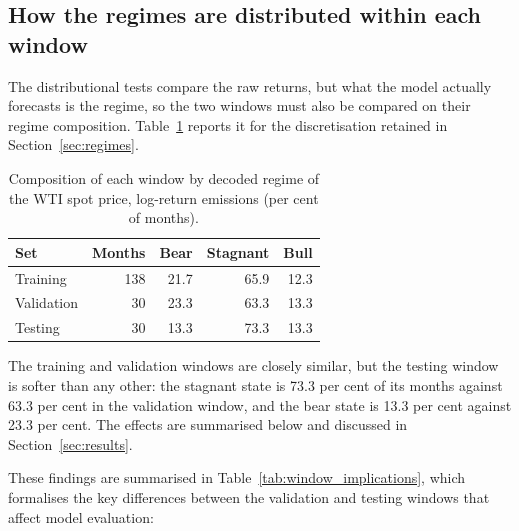 \documentclass[11pt,a4paper]{article}
\begin{document}
\subsection{How the regimes are distributed within each window}

The distributional tests compare the raw returns, but what the model actually 
forecasts is the regime, so the two windows must also be compared on their regime 
 composition. Table~\ref{tab:shares} reports it for the discretisation retained 
 in Section~\ref{sec:regimes}.

\begin{table}[H]
\centering
\caption{Composition of each window by decoded regime of the WTI spot price, log-return emissions
(per cent of months).}
\label{tab:shares}
\begin{tabular}{@{}lrrrr@{}}
\toprule
\textbf{Set} & \textbf{Months} & \textbf{Bear} & \textbf{Stagnant} & \textbf{Bull} \\
\midrule
Training   & 138 & 21.7 & 65.9 & 12.3 \\
Validation &  30 & 23.3 & 63.3 & 13.3 \\
Testing    &  30 & 13.3 & 73.3 & 13.3 \\
\bottomrule
\end{tabular}
\end{table}

The training and validation windows are closely similar, but the testing window is softer than
any other: the stagnant state is 73.3 per cent of its months against 63.3 per cent in the
validation window, and the bear state is 13.3 per cent against 23.3 per cent. The effects
are summarised below and discussed in Section~\ref{sec:results}.

These findings are summarised in Table~\ref{tab:window_implications}, which formalises the key differences between the validation and testing windows that affect model evaluation:
\end{document}
